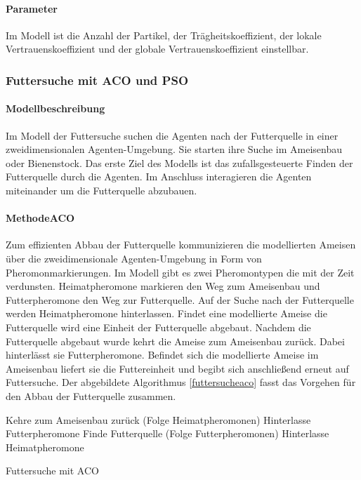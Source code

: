 \documentclass[a4paper, 11pt]{article}
\begin{document}
\paragraph{Parameter}
Im Modell ist die Anzahl der Partikel, der Trägheitskoeffizient, der lokale Vertrauenskoeffizient und der globale Vertrauenskoeffizient einstellbar.
\newpage
\subsubsection{Futtersuche mit \acs{ACO} und \acs{PSO}}
\paragraph{Modellbeschreibung}
Im Modell der Futtersuche suchen die Agenten nach der Futterquelle in einer zweidimensionalen Agenten-Umgebung. Sie starten ihre Suche im Ameisenbau oder Bienenstock. Das erste Ziel des Modells ist das zufallsgesteuerte Finden der Futterquelle durch die Agenten. Im Anschluss interagieren die Agenten miteinander um die Futterquelle abzubauen. 
\paragraph{Methode\acs{ACO}}
Zum effizienten Abbau der Futterquelle kommunizieren die modellierten Ameisen über die zweidimensionale Agenten-Umgebung in Form von Pheromonmarkierungen. Im Modell gibt es zwei Pheromontypen die mit der Zeit verdunsten. Heimatpheromone markieren den Weg zum Ameisenbau und Futterpheromone den Weg zur Futterquelle. Auf der Suche nach der Futterquelle werden Heimatpheromone hinterlassen. Findet eine modellierte Ameise die Futterquelle wird eine Einheit der Futterquelle abgebaut. Nachdem die Futterquelle abgebaut wurde kehrt die Ameise zum Ameisenbau zurück. Dabei hinterlässt sie Futterpheromone. Befindet sich die modellierte Ameise im Ameisenbau liefert sie die Futtereinheit und begibt sich anschließend erneut auf Futtersuche. Der abgebildete Algorithmus \ref{futtersucheaco} fasst das Vorgehen für den Abbau der Futterquelle zusammen.
\begin{framed}
	\begin{algorithm}[H]
			{
				Kehre zum Ameisenbau zurück (Folge Heimatpheromonen)\;
				Hinterlasse Futterpheromone\;
			}
			{
				Finde Futterquelle (Folge Futterpheromonen)\;
				Hinterlasse Heimatpheromone\;
			}
		\caption{Futtersuche mit \acs{ACO}}
		\label{futtersucheaco}
	\end{algorithm}
\end{framed}
\end{document}
